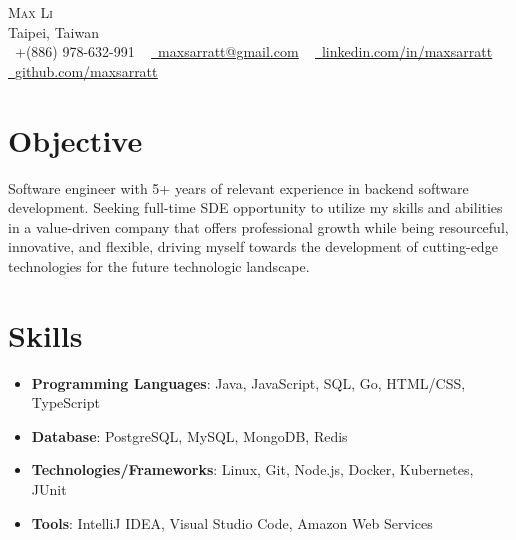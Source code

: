 \documentclass[letterpaper,11pt]{article}
\newcommand{\resumeItemTwo}[2]{
  \item{
    \textbf{#1}{: \small #2 \vspace{-2pt}}
  }
}
\newcommand{\resumeSubItem}[2]{\resumeItemTwo{#1}{#2}\vspace{-4pt}}
\newcommand{\resumeSubHeadingListStart}{\begin{itemize}[leftmargin=0.0in, label={}]}
\newcommand{\resumeSubHeadingListEnd}{\end{itemize}}
\begin{document}
\begin{center}
    {\Huge \scshape Max Li} \\ \vspace{4pt}
    Taipei, Taiwan \\ \vspace{4pt}
    \small \raisebox{-0.1\height}\faPhone\ +(886) 978-632-991 ~ \href{mailto:maxsarratt@gmail.com}{\raisebox{-0.2\height}\faEnvelope\  \underline{maxsarratt@gmail.com}} ~ 
    \href{https://www.linkedin.com/in/maxsarratt/}{\raisebox{-0.2\height}\faLinkedin\ \underline{linkedin.com/in/maxsarratt}}  ~
    \href{https://github.com/maxsarratt}{\raisebox{-0.2\height}\faGithub\ \underline{github.com/maxsarratt}}
    \vspace{-8pt}
\end{center}

\section{Objective}
  \begin{flushleft}
    {Software engineer with 5+ years of relevant experience in backend software development. Seeking full-time SDE opportunity to utilize my skills and abilities in a value-driven company that offers professional growth while being resourceful, innovative, and flexible, driving myself towards the development of cutting-edge technologies for the future technologic landscape.}
  \end{flushleft}
  
\section{Skills}
  \resumeSubHeadingListStart
    \resumeSubItem{Programming Languages}
      {Java, JavaScript, SQL, Go, HTML/CSS, TypeScript}
    \resumeSubItem{Database}
      {PostgreSQL, MySQL, MongoDB, Redis}
    \resumeSubItem{Technologies/Frameworks}
      {Linux, Git, Node.js, Docker, Kubernetes, JUnit}
      \resumeSubItem{Tools}
        {IntelliJ IDEA, Visual Studio Code, Amazon Web Services}
  \resumeSubHeadingListEnd

\end{document}
